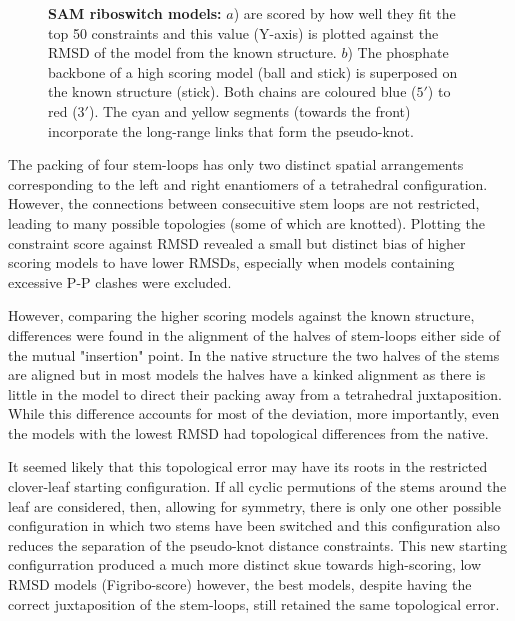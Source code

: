 \begin{figure}
\centering
{}
\caption{
\label{Fig:myo2DFS}
{\bf SAM riboswitch models:} $a$) are scored by how well they fit the top 50 constraints
and this value (Y-axis) is plotted against the RMSD of the model from the known structure.
$b$) The phosphate backbone of a high scoring model (ball and stick) is superposed on the 
known structure (stick).  Both chains are coloured blue ($5'$) to red ($3'$).
The cyan and yellow segments (towards the front) incorporate the long-range links that
form the pseudo-knot.
}
\end{figure}

The packing of four stem-loops has only two distinct spatial arrangements corresponding to
the left and right enantiomers of a tetrahedral configuration.   However, the connections 
between consecuitive stem loops are not restricted, leading to many possible topologies
(some of which are knotted).   Plotting the constraint score against RMSD revealed a
small but distinct bias of higher scoring models to have lower RMSDs, especially when
models containing excessive P-P clashes were excluded.

However, comparing the higher scoring models against the known structure, differences
were found in the alignment of the halves of stem-loops either side of the mutual
"insertion" point.  In the native structure the two halves of the stems are aligned but
in most models the halves have a kinked alignment as there is little in the model to
direct their packing away from a tetrahedral juxtaposition.   While this difference
accounts for most of the deviation, more importantly, even the models with the lowest 
RMSD had topological differences from the native.     

It seemed likely that this topological error may have its roots in the restricted
clover-leaf starting configuration.   If all cyclic permutions of the stems around the
leaf are considered, then, allowing for symmetry, there is only one other possible
configuration in which two stems have been switched and this configuration
also reduces the separation of the pseudo-knot distance constraints.  This new starting
configurration produced a much more distinct skue towards high-scoring, low RMSD models
(Fig{ribo-score}) however, the best models, despite having the correct juxtaposition
of the stem-loops, still retained the same topological error.
